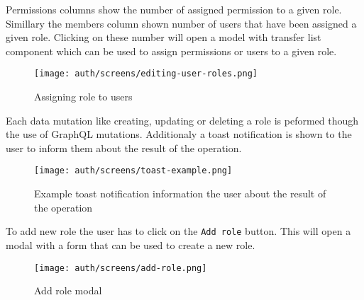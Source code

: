 \documentclass[../main.tex]{subfiles}
\begin{document}
Permissions columns show the number of assigned permission to a given role.
Simillary the members column shown number of users that have been assigned a given role.
Clicking on these number will open a model with transfer list component which can be used to assign permissions or users to a given role.

\begin{figure}[H]
  \centering
  \texttt{[image: auth/screens/editing-user-roles.png]}
  \caption{Assigning role to users}
\end{figure}

Each data mutation like creating, updating or deleting a role is peformed though the use of GraphQL mutations.
Additionaly a toast notification is shown to the user to inform them about the result of the operation.

\begin{figure}[H]
  \centering
  \texttt{[image: auth/screens/toast-example.png]}
  \caption{Example toast notification information the user about the result of the operation}
\end{figure}

To add new role the user has to click on the \texttt{Add role} button. This will open a modal with a form that can be used to create a new role.

\begin{figure}[H]
  \centering
  \texttt{[image: auth/screens/add-role.png]}
  \caption{Add role modal}
\end{figure}
\end{document}
